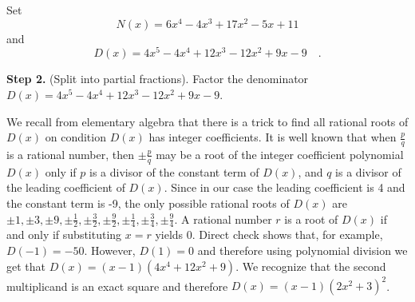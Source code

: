 {\noindent Set
\[
N(x)= 6 x^{4}-4 x^{3}+17 x^{2}-5 x+11
\]
and
\[
D(x)= 4x^{5}-4 x^{4}+12 x^{3}-12 x^{2}+9 x-9\quad .
\]

\noindent\textbf{Step 2.} (Split into partial fractions). Factor the denominator $D(x)=4x^{5}-4 x^{4}+12 x^{3}-12 x^{2}+9 x-9$. 

We recall from elementary algebra that there is a trick to find all rational roots of $D(x)$ on condition $D(x)$ has integer coefficients. It is well known that when $\frac{p}{q}$ is a rational number, then $\pm \frac{p}{q}$ may be a root of the integer coefficient polynomial $D(x)$ only if $p$ is a divisor of the constant term of $D(x)$, and $q$ is a divisor of the leading coefficient of $D(x)$. Since in our case the leading coefficient is 4 and the constant term is -9, the only possible rational roots of $D(x)$ are $\pm 1, \pm 3, \pm 9, \pm \frac{1}{2}, \pm \frac{3}{2}, \pm \frac{9}{2}, \pm \frac{1}{4}, \pm \frac{3}{4}, \pm \frac{9}{4}$. A rational number $r$ is a root of $D(x)$ if and only if substituting $x=r$ yields 0. Direct check shows that, for example,  $D(-1)=-50$. However, $D(1)=0$ and therefore using polynomial division we get that $D(x)=(x-1)(4x^{4}+12x^{2}+9)$. We recognize that the second multiplicand is an exact square and therefore $D(x)=(x-1)(2x^2+3)^2$.


}
